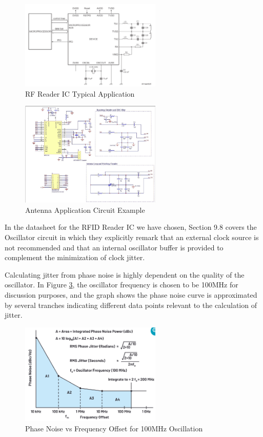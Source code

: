 \documentclass[12pt]{article}
\begin{document}
\begin{figure}[!h]
	\centering
	\includegraphics[width=0.6\textwidth]{image7.png}
	\caption{RF Reader IC Typical Application}
	\label{fig:reader}
\end{figure}

\begin{figure}[!h]
	\centering
	\includegraphics[width=0.6\textwidth]{image3.png}
	\caption{Antenna Application Circuit Example}
	\label{fig:antenna}
\end{figure}

In the datasheet for the RFID Reader IC we have chosen, Section 9.8 covers the Oscillator circuit in which they explicitly remark that an external clock source is not recommended and that an internal oscillator buffer is provided to complement the minimization of clock jitter. 

Calculating jitter from phase noise is highly dependent on the quality of the oscillator. In Figure \ref{fig:noise}, the oscillator frequency is chosen to be 100MHz for discussion purposes, and the graph shows the phase noise curve is approximated by several tranches indicating different data points relevant to the calculation of jitter.

\begin{figure}[!h]
	\centering
	\includegraphics[width=0.6\textwidth]{image4.png}
	\caption{Phase Noise vs Frequency Offset for 100MHz Oscillation}
	\label{fig:noise}
\end{figure}
\end{document}
